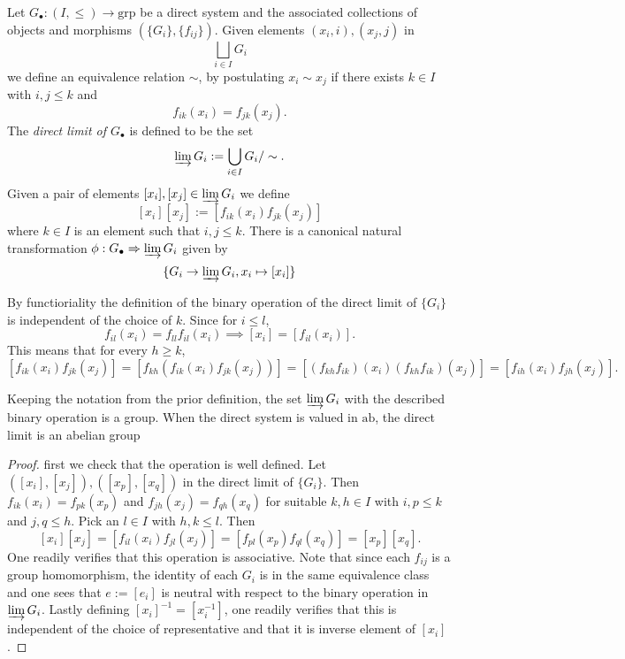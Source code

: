 \begin{definition}
    Let $G_\bullet: (I,\leq) \rightarrow \mathrm{grp}$ be a direct system and the associated collections of objects and morphisms $(\{G_i\},\{f_{ij}\})$. Given elements $(x_i,i),(x_j,j)$ in  
    $$
        \bigsqcup_{i\in I} G_i
    $$
    we define an equivalence relation $\sim$, by postulating $x_i\sim x_j$ if there exists $k\in I$ with $i,j\leq k$ and 
    $$
        f_{ik}(x_i) = f_{jk}(x_j).
    $$
    The \emph{direct limit of $G_\bullet$} is defined to be the set 
    $$
        \varinjlim G_i := \bigcup_{i\in I} G_i/\sim.
    $$
    Given a pair of elements $[x_i],[x_j]\in \varinjlim G_i$ we define 
    $$
        [x_i][x_j] := [f_{ik}(x_i)f_{jk}(x_j)]
    $$
    where $k\in I$ is an element such that $i,j\leq k$. There is a canonical natural transformation $\phi: G_\bullet \Rightarrow \varinjlim G_i$ given by
    $$\{G_i \rightarrow \varinjlim G_i, x_i \mapsto [x_i]\}$$
\end{definition}
\begin{remark}
    By functioriality the definition of the binary operation of the direct limit of $\{G_i\}$ is independent of the choice of $k$. Since for $i\leq l$, 
    $$
        f_{il}(x_i) = f_{ll}f_{il}(x_i) \implies [x_i]=[f_{il}(x_i)].
    $$
    This means that for every $h\geq k$, 
    $$
        [f_{ik}(x_i)f_{jk}(x_j)] = [f_{kh}(f_{ik}(x_i)f_{jk}(x_j))] =[(f_{kh}f_{ik})(x_i)(f_{kh}f_{ik})(x_j)]=[f_{ih}(x_i)f_{jh}(x_j)].
    $$
\end{remark}
\begin{lemma}
    Keeping the notation from the prior definition, the set $\varinjlim G_i$ with the described binary operation is a group. When the direct system is valued in $\mathrm{ab}$, the direct limit is an abelian group
\end{lemma}
\begin{proof}
    first we check that the operation is well defined. Let $([x_i],[x_j]),([x_p],[x_q])$ in the direct limit of $\{G_i\}$. Then $f_{ik}(x_i)=f_{pk}(x_p)$ and $f_{jh}(x_j)=f_{qh}(x_q)$ for suitable $k,h\in I$ with $i,p\leq k$ and $j,q\leq h$. Pick an $l\in I$ with $h,k\leq l$. Then 
    $$
        [x_i][x_j]=[f_{il}(x_i)f_{jl}(x_j)]=[f_{pl}(x_p)f_{ql}(x_q)] = [x_p][x_q].
    $$
    One readily verifies that this operation is associative.
    Note that since each $f_{ij}$ is a group homomorphism, the identity of each $G_i$ is in the same equivalence class and one sees that $e:=[e_i]$ is neutral with respect to the binary operation in $\varinjlim G_i$. Lastly defining $[x_i]^{-1} = [x_i^{-1}]$, one readily verifies that this is independent of the choice of representative and that it is inverse element of $[x_i]$.
\end{proof}
